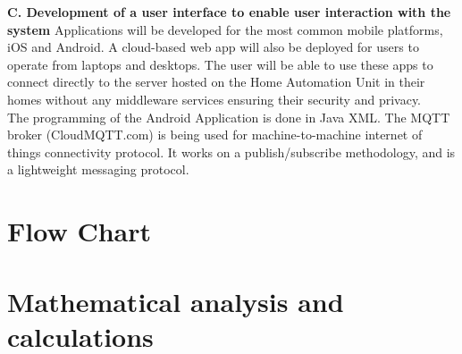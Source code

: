          \textbf{C. Development of a user interface to enable user interaction with the system}
         Applications will be developed for the most common mobile platforms, iOS and Android. A cloud-based web app will also be deployed for users to operate from laptops and desktops. The user will be able to use these apps to connect directly to the server hosted on the Home Automation Unit in their homes without any middleware services ensuring their security and privacy.\\
         The programming of the Android Application is done in Java XML. The MQTT broker (CloudMQTT.com) is being used for machine-to-machine internet of things connectivity protocol. It works on a publish/subscribe methodology, and is a lightweight messaging protocol.
        \section{Flow Chart}
        \section{Mathematical analysis and calculations}
